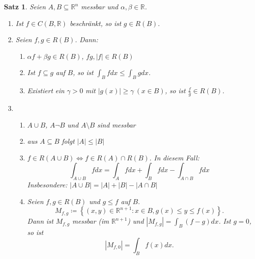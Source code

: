 \documentclass[12pt]{extreport} %
\newcommand{\R}{\mathbb{R}}
\theoremstyle{named}
\theoremstyle{nnamed}
\theoremstyle{itshape}
\newtheorem{satz}[unnamedtheorem]{Satz}
\theoremstyle{normal}
\begin{document}
\begin{satz} \label{20.5:satz}
	Seien $A, B \subseteq \R^{n}$ messbar und $\alpha, \beta \in \R$.
	\begin{enumerate}
		\item Ist $f \in C(B, \R)$ beschränkt, so ist $g \in R(B)$. \label{20.5.a:satz}
		\item Seien $f, g \in R(B)$. Dann: \label{20.5.b:satz}
			\begin{enumerate}
				\item $\alpha f + \beta g \in R(B)$, $fg, |f| \in R(B)$ 
				\item Ist $f \subseteq g$ auf $B$, so ist $\int_{B} f dx \leq \int_{B} g dx$.
				\item Existiert ein $\gamma > 0$ mit $|g(x)| \geq \gamma ~(x \in B)$, so ist $\frac{f}{g} \in R(B)$.
			\end{enumerate}
		\item \begin{enumerate} \label{20.5.c:satz}
				\item $A \cup B$, $A \neg B$ und $A \setminus B$ sind messbar 
				\item aus $A \subseteq B$ folgt $|A| \leq |B|$
				\item $f \in R(A \cup B) \iff f \in R(A) \cap R(B)$. In diesem Fall:
					$$ \int_{A \cup B} f dx = \int_{A} f dx + \int_{B} f dx - \int_{A \cap B} f dx $$
					Insbesondere: $|A \cup B| = |A| + |B| - |A \cap B|$
				\item Seien $f, g \in R(B)$ und $g \leq f$ auf $B$. \label{20.5.c.4:satz}
					$$ M_{f,g} \coloneqq \left\{ (x, y) \in \R^{n+1}: x \in B, g(x) \leq y \leq f(x) \right\}. $$
					Dann ist $M_{f,g}$ messbar (im $\R^{n+1}$) und $|M_{f,g}| = \int_{B} \left( f - g \right) dx$.  %
					Ist $g = 0$, so ist 
					$$\left|M_{f,0}\right| = \int_{B} f(x) dx. $$ %
			  \end{enumerate}
	\end{enumerate}
\end{satz}
\end{document}

